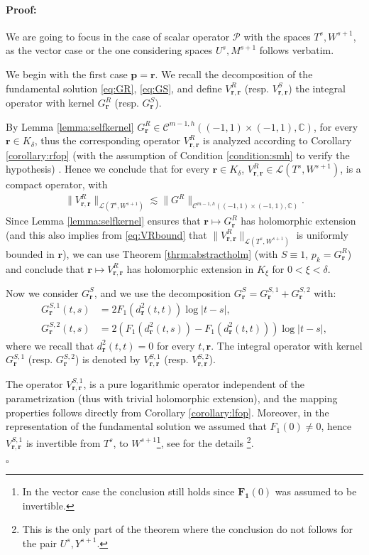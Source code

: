 \documentclass{article}
\newenvironment{proof}{\paragraph{Proof:}}{\hfill$\square$}
\newcommand{\IC}{{\mathbb C}}
\newcommand{\bp}{{\bm p}}
\newcommand{\cmspaceh}[4]{\mathcal{C}^{#1,#2} \left( #3, #4 \right)}
\newcommand{\cP}{\mathcal{P}}
\newcommand{\br}{\bm{r}}
\newcommand{\iinterv}{(-1,1)\times(-1,1)}
\begin{document}
\begin{proof} 
We are going to focus in the case of scalar operator $\cP$ with the spaces $T^s,W^{s+1}$, as the vector case or the one considering spaces $U^s,M^{s+1}$ follows verbatim. 

We begin with the first case $\bp = \br$. We recall the decomposition of the fundamental solution \eqref{eq:GR}, \eqref{eq:GS}, and define $V_{\br,\br}^R$ (resp. $V_{\br,\br}^S$) the integral operator with kernel $G_{\br}^R$ (resp. $G_{\br}^S$).

By Lemma \ref{lemma:selfkernel} $G_{\br}^R \in \cmspaceh{m-1}{h}{\iinterv}{\IC}$, for every $\br \in K_\delta$, thus the corresponding operator $V_{\br,\br}^R$ is analyzed according to Corollary \ref{corollary:rfop} (with the assumption of Condition \ref{condition:smh} to verify the hypothesis) . Hence we conclude that for every $\br \in K_\delta$, $
V_{\br,\br}^R \in \mathcal{L}\left( T^s,W^{s+1} \right)$, is a compact operator, with 
\begin{align}
\label{eq:VRbound}
\|V_{\br,\br}^R \|_{\mathcal{L}\left( T^s,W^{s+1}\right)} \lesssim \|G^R\|_{\cmspaceh{m-1}{h}{\iinterv}{\IC}}.
\end{align}
Since Lemma \ref{lemma:selfkernel} ensures that $\br \mapsto G_{\br}^R$ has holomorphic extension (and this also implies from \eqref{eq:VRbound} that $\|V_{\br,\br}^R \|_{\mathcal{L}\left( T^s,W^{s+1}\right)}$ is uniformly bounded in $\br$), we can use Theorem \ref{thrm:abstractholm} (with $S \equiv 1$, $p_k = G_{\br}^R$) and conclude that $\br \mapsto V^R_{\br,\br}$ has holomorphic extension in $K_\xi$ for $0< \xi < \delta$.

Now we consider $G_{\br}^S$, and we use the decomposition $G_{\br}^S= G_{\br}^{S,1}+G_{\br}^{S,2}$ with:
\begin{align*}
G_{\br}^{S,1}(t,s) &=2F_1(d_{\br}^2(t,t)) \log|t-s|,\\
G_{\br}^{S,2}(t,s) &= 2(F_1(d_{\br}^2(t,s))-F_1(d_{\br}^2(t,t)))\log|t-s|,
\end{align*}
where we recall that $d^2_{\br}(t,t)=0$ for every $t,\br$. The integral operator with kernel $G_{\br}^{S,1}$ (resp. $G_{\br}^{S,2}$) is denoted by $V^{S,1}_{\br,\br}$ (resp. $V^{S,2}_{\br,\br}$).

The operator $V^{S,1}_{\br,\br}$, is a pure logarithmic operator independent of the parametrization (thus with trivial holomorphic extension), and the mapping properties follows directly from Corollary \ref{corollary:lfop}. Moreover, in the representation of the fundamental solution we assumed that $F_1(0) \neq 0 $, hence $V_{\br,\br}^{S,1}$  is invertible from $T^s$, to $W^{s+1}$\footnote{In the vector case the conclusion still holds since $\mathbf{F_1}(0)$ was assumed to be invertible.}, see \cite{JEREZHANCKES2011547} for the details \footnote{This is the only part of the theorem where the conclusion do not follows for the pair $U^s,Y^{s+1}$.}.


\end{proof}
\end{document}

